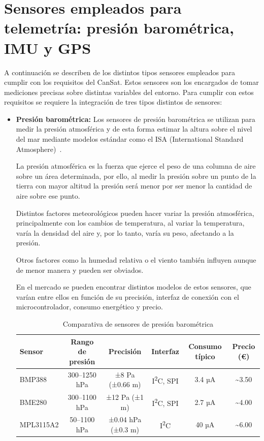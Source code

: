 \section{Sensores empleados para telemetría: presión barométrica, IMU y GPS}
A continuación se describen de los distintos tipos sensores empleados para cumplir con los requisitos del CanSat.
Estos sensores son los encargados de tomar mediciones precisas sobre distintas variables del entorno.
Para cumplir con estos requisitos se requiere la integración de tres tipos distintos de sensores:
\begin{itemize}
    \item \textbf{Presión barométrica:} Los sensores de presión barométrica se utilizan para medir la presión atmosférica y de esta forma estimar la altura sobre el nivel del mar mediante modelos estándar como el ISA (International Standard Atmosphere)~\cite{skybrary_isa}.

    La presión atmosférica es la fuerza que ejerce el peso de una columna de aire sobre un área determinada,
    por ello, al medir la presión sobre un punto de la tierra con mayor altitud la presión será menor por ser menor la cantidad de aire sobre ese punto.

    Distintos factores meteorológicos pueden hacer variar la presión atmosférica, principalmente con los cambios de temperatura,
    al variar la temperatura, varía la densidad del aire y, por lo tanto, varía su peso, afectando a la presión.

    Otros factores como la humedad relativa o el viento también influyen aunque de menor manera y pueden ser obviados.

    En el mercado se pueden encontrar distintos modelos de estos sensores, que varían entre ellos en función de su precisión, interfaz de conexión con el microcontrolador, consumo energético y precio.
    \begin{table}[h]
        \centering
        \footnotesize
        \begin{tabular}{|l|c|c|c|c|c|}
            \hline
            \textbf{Sensor} & \textbf{Rango de presión} & \textbf{Precisión} & \textbf{Interfaz}          & \textbf{Consumo típico} & \textbf{Precio (€)} \\
            \hline
            BMP388          & 300–1250 hPa              & ±8 Pa (±0.66 m)    & I\textsuperscript{2}C, SPI & 3.4 µA                  & \textasciitilde3.50 \\
            \hline
            BME280          & 300–1100 hPa              & ±12 Pa (±1 m)      & I\textsuperscript{2}C, SPI & 2.7 µA                  & \textasciitilde4.00 \\
            \hline
            MPL3115A2       & 50–1100 hPa               & ±0.04 hPa (±0.3 m) & I\textsuperscript{2}C      & 40 µA                   & \textasciitilde6.00 \\
            \hline
        \end{tabular}
        \caption{Comparativa de sensores de presión barométrica}
        \label{tab:barometric_sensors}
    \end{table}



\end{itemize}
